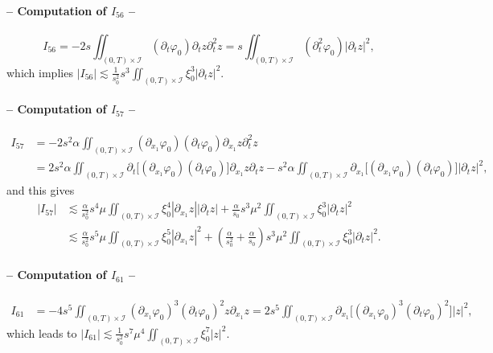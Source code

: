 \documentclass[a4paper, 12pt]{article}
\theoremstyle{plain}
\theoremstyle{definition}
\numberwithin{theorem}{section}
\numberwithin{equation}{section}
\begin{document}
{\paragraph{-- Computation of $I_{56}$ --}
$$
I_{56}=-2s\iint_{(0,T)\times\mathcal{I}}(\partial_t\varphi_0)\partial_tz\partial^2_tz=s\iint_{(0,T)\times\mathcal{I}}(\partial^2_t\varphi_0)|\partial_tz|^2,
$$
which implies
$\displaystyle  |I_{56}|\lesssim \frac{1}{s_0^2}s^3\iint_{(0,T)\times\mathcal{I}}\xi_0^{3}|\partial_t z|^2.$
\paragraph{-- Computation of $I_{57}$ --}
\begin{align*}
I_{57}&=-2s^2\alpha\iint_{(0,T)\times\mathcal{I}}(\partial_{x_1}\varphi_0)(\partial_t\varphi_0)\partial_{x_1}z\partial^2_tz\\
&=2s^2\alpha\iint_{(0,T)\times\mathcal{I}}\partial_t\big[(\partial_{x_1}\varphi_0)(\partial_t\varphi_0)\big]\partial_{x_1}z\partial_tz-s^2\alpha\iint_{(0,T)\times\mathcal{I}}\partial_{x_1}\big[(\partial_{x_1}\varphi_0)(\partial_t\varphi_0)\big]|\partial_tz|^2,
\end{align*}
and this gives
\begin{align*}
|I_{57}|&\lesssim \frac{\alpha}{s_0^2} s^4\mu \iint_{(0,T)\times\mathcal{I}}\xi_0^4|\partial_{x_1}z||\partial_tz|+\frac{\alpha}{s_0} s^3\mu^2\iint_{(0,T)\times\mathcal{I}}\xi_0^3|\partial_tz|^2\\
&\lesssim \frac{\alpha}{s_0^2} s^5\mu \iint_{(0,T)\times\mathcal{I}}\xi_0^5|\partial_{x_1}z|^2+\left(\frac{\alpha}{s_0^2}+\frac{\alpha}{s_0}\right) s^3\mu^2\iint_{(0,T)\times\mathcal{I}}\xi_0^3|\partial_tz|^2.
\end{align*}
\paragraph{-- Computation of $I_{61}$ --}
\begin{align*}
I_{61}&=-4s^5\iint_{(0,T)\times\mathcal{I}}(\partial_{x_1}\varphi_0)^3(\partial_t\varphi_0)^2z\partial_{x_1}z=2s^5\iint_{(0,T)\times\mathcal{I}}\partial_{x_1}\big[(\partial_{x_1}\varphi_0)^3(\partial_t\varphi_0)^2\big]|z|^2,
\end{align*}
which leads to
$
\displaystyle |I_{61}|\lesssim  \frac{1}{s_0^2}s^7\mu^4\iint_{(0,T)\times\mathcal{I}}\xi_0^7|z|^2.
$
}
\end{document}
